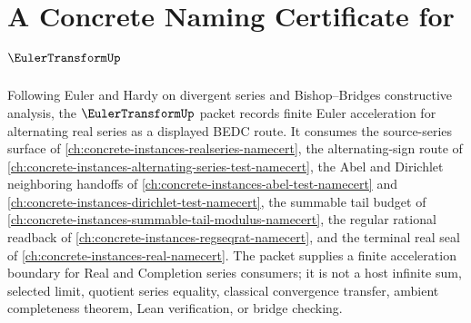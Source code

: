\chapter{A Concrete Naming Certificate for $\EulerTransformUp$}
\label{ch:concrete-instances-euler-transform-namecert}

Following Euler and Hardy on divergent series and Bishop--Bridges constructive analysis, the $\EulerTransformUp$ packet records finite Euler acceleration for alternating real series as a displayed BEDC route. It consumes the source-series surface of \autoref{ch:concrete-instances-realseries-namecert}, the alternating-sign route of \autoref{ch:concrete-instances-alternating-series-test-namecert}, the Abel and Dirichlet neighboring handoffs of \autoref{ch:concrete-instances-abel-test-namecert} and \autoref{ch:concrete-instances-dirichlet-test-namecert}, the summable tail budget of \autoref{ch:concrete-instances-summable-tail-modulus-namecert}, the regular rational readback of \autoref{ch:concrete-instances-regseqrat-namecert}, and the terminal real seal of \autoref{ch:concrete-instances-real-namecert}. The packet supplies a finite acceleration boundary for Real and Completion series consumers; it is not a host infinite sum, selected limit, quotient series equality, classical convergence transfer, ambient completeness theorem, Lean verification, or bridge checking.

